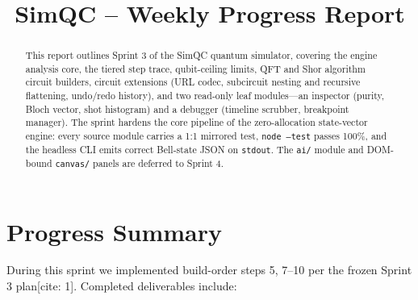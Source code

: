 \documentclass[conference]{IEEEtran}
\begin{document}
\title{SimQC -- Weekly Progress Report\\}
\author{
}

\maketitle

\begin{abstract}
This report outlines Sprint 3 of the SimQC quantum simulator, covering the engine analysis core, the tiered step trace, qubit-ceiling limits, QFT and Shor algorithm circuit builders, circuit extensions (URL codec, subcircuit nesting and recursive flattening, undo/redo history), and two read-only leaf modules---an inspector (purity, Bloch vector, shot histogram) and a debugger (timeline scrubber, breakpoint manager). The sprint hardens the core pipeline of the zero-allocation state-vector engine: every source module carries a 1:1 mirrored test, \texttt{node --test} passes 100\%, and the headless CLI emits correct Bell-state JSON on \texttt{stdout}. The \texttt{ai/} module and DOM-bound \texttt{canvas/} panels are deferred to Sprint 4.
\end{abstract}

\section{Progress Summary}
During this sprint we implemented build-order steps 5, 7--10 per the frozen Sprint 3 plan[cite: 1]. Completed deliverables include:
\end{document}

